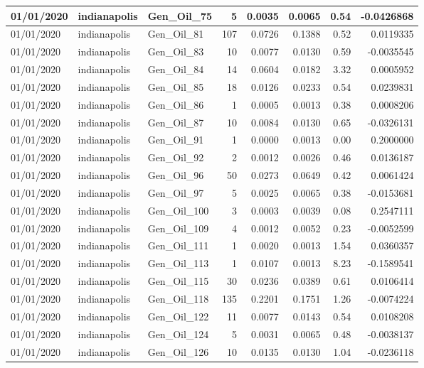 \documentclass[
  letterpaper,
  DIV=11,
  numbers=noendperiod]{scrartcl}
\begin{document}
\begin{tabular}{l|l|l|r|r|r|r|r}
\hline
01/01/2020 & indianapolis & Gen\_Oil\_75 & 5 & 0.0035 & 0.0065 & 0.54 & -0.0426868\\
\hline
01/01/2020 & indianapolis & Gen\_Oil\_81 & 107 & 0.0726 & 0.1388 & 0.52 & 0.0119335\\
\hline
01/01/2020 & indianapolis & Gen\_Oil\_83 & 10 & 0.0077 & 0.0130 & 0.59 & -0.0035545\\
\hline
01/01/2020 & indianapolis & Gen\_Oil\_84 & 14 & 0.0604 & 0.0182 & 3.32 & 0.0005952\\
\hline
01/01/2020 & indianapolis & Gen\_Oil\_85 & 18 & 0.0126 & 0.0233 & 0.54 & 0.0239831\\
\hline
01/01/2020 & indianapolis & Gen\_Oil\_86 & 1 & 0.0005 & 0.0013 & 0.38 & 0.0008206\\
\hline
01/01/2020 & indianapolis & Gen\_Oil\_87 & 10 & 0.0084 & 0.0130 & 0.65 & -0.0326131\\
\hline
01/01/2020 & indianapolis & Gen\_Oil\_91 & 1 & 0.0000 & 0.0013 & 0.00 & 0.2000000\\
\hline
01/01/2020 & indianapolis & Gen\_Oil\_92 & 2 & 0.0012 & 0.0026 & 0.46 & 0.0136187\\
\hline
01/01/2020 & indianapolis & Gen\_Oil\_96 & 50 & 0.0273 & 0.0649 & 0.42 & 0.0061424\\
\hline
01/01/2020 & indianapolis & Gen\_Oil\_97 & 5 & 0.0025 & 0.0065 & 0.38 & -0.0153681\\
\hline
01/01/2020 & indianapolis & Gen\_Oil\_100 & 3 & 0.0003 & 0.0039 & 0.08 & 0.2547111\\
\hline
01/01/2020 & indianapolis & Gen\_Oil\_109 & 4 & 0.0012 & 0.0052 & 0.23 & -0.0052599\\
\hline
01/01/2020 & indianapolis & Gen\_Oil\_111 & 1 & 0.0020 & 0.0013 & 1.54 & 0.0360357\\
\hline
01/01/2020 & indianapolis & Gen\_Oil\_113 & 1 & 0.0107 & 0.0013 & 8.23 & -0.1589541\\
\hline
01/01/2020 & indianapolis & Gen\_Oil\_115 & 30 & 0.0236 & 0.0389 & 0.61 & 0.0106414\\
\hline
01/01/2020 & indianapolis & Gen\_Oil\_118 & 135 & 0.2201 & 0.1751 & 1.26 & -0.0074224\\
\hline
01/01/2020 & indianapolis & Gen\_Oil\_122 & 11 & 0.0077 & 0.0143 & 0.54 & 0.0108208\\
\hline
01/01/2020 & indianapolis & Gen\_Oil\_124 & 5 & 0.0031 & 0.0065 & 0.48 & -0.0038137\\
\hline
01/01/2020 & indianapolis & Gen\_Oil\_126 & 10 & 0.0135 & 0.0130 & 1.04 & -0.0236118\\

\end{tabular}
\end{document}
